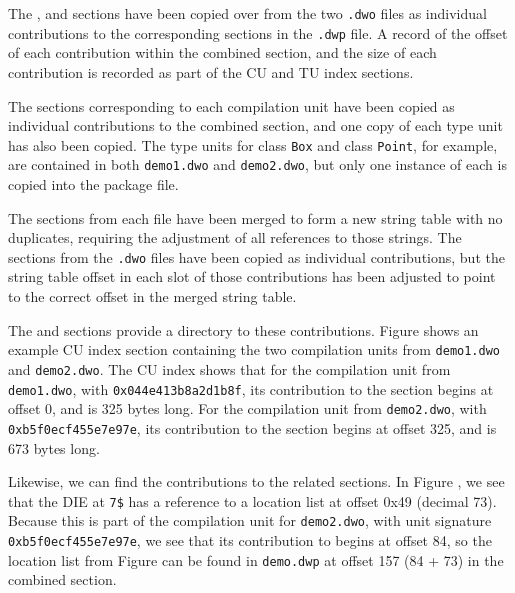 The \dotdebugabbrevdwo{}, \dotdebuglocdwo{} and \dotdebuglinedwo{}
sections have been copied over from the two \texttt{.dwo} files as
individual contributions to the corresponding sections in the
\texttt{.dwp} file. A record of the offset of each contribution within 
the combined section, and the size of each contribution is recorded
as part of the CU and TU index sections.

The \dotdebuginfodwo{} sections corresponding to each compilation
unit have been copied as individual contributions to the combined
\dotdebuginfodwo{} section, and one copy of each type unit has also
been copied. The type units for class \texttt{Box} and class 
\texttt{Point}, for example, are contained in both \texttt{demo1.dwo} 
and \texttt{demo2.dwo}, but only one instance of each is copied into 
the package file.

The \dotdebugstrdwo{} sections from each file have been merged to
form a new string table with no duplicates, requiring the
adjustment of all references to those strings. The
\dotdebugstroffsetsdwo{} sections from the \texttt{.dwo} files have 
been copied as individual contributions, but the string table offset
in each slot of those contributions has been adjusted to point to
the correct offset in the merged string table.

The \dotdebugcuindex{} and \dotdebugtuindex{} sections provide a
directory to these contributions. 
Figure  shows an example CU
index section containing the two compilation units from 
\texttt{demo1.dwo} and \texttt{demo2.dwo}. The CU index shows that 
for the compilation unit from \texttt{demo1.dwo}, with \CUsignature{} 
\texttt{0x044e413b8a2d1b8f}, its contribution to the \dotdebuginfodwo{} 
section begins at offset 0, and is 325 bytes long. For the compilation 
unit from \texttt{demo2.dwo}, with \CUsignature{} 
\texttt{0xb5f0ecf455e7e97e}, its contribution to the \dotdebuginfodwo{}
section begins at offset 325, and is 673 bytes long.

Likewise, we can find the contributions to the related sections.
In Figure , 
we see that the \DWTAGvariable{} DIE at \texttt{7\$} has a
reference to a location list at offset 0x49 (decimal 73). Because
this is part of the compilation unit for \texttt{demo2.dwo}, with 
unit signature \texttt{0xb5f0ecf455e7e97e}, we see that its contribution 
to \dotdebuglocdwo{} begins at offset 84, so the location list from
Figure  
can be found in \texttt{demo.dwp} at offset 157 (84 + 73) in
the combined \dotdebuglocdwo{} section.


